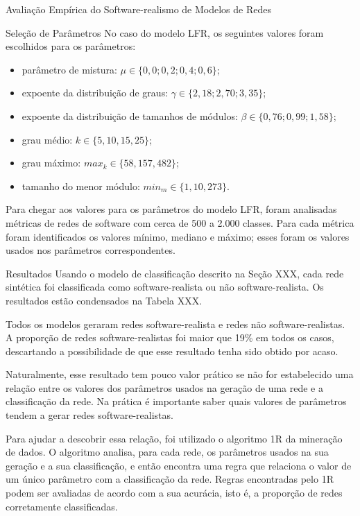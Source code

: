 \begin{section}{Avaliação Empírica do Software-realismo de Modelos de Redes}
\begin{subsection}{Seleção de Parâmetros}
No caso do modelo LFR, os seguintes valores foram escolhidos para os parâmetros:

\begin{itemize}
	\item parâmetro de mistura: $\mu \in \{0,0; 0,2; 0,4; 0,6\}$;
	\item expoente da distribuição de graus: $\gamma \in \{2,18; 2,70; 3,35\}$;
	\item expoente da distribuição de tamanhos de módulos: $\beta \in \{0,76; 0,99; 1,58\}$;
	\item grau médio: $k \in \{5, 10, 15, 25\}$;
	\item grau máximo: $max_k \in \{58, 157, 482\}$;
	\item tamanho do menor módulo: $min_m \in \{1, 10, 273\}$.
\end{itemize}

Para chegar aos valores para os parâmetros do modelo LFR, foram analisadas métricas de redes de software com cerca de 500 a 2.000 classes. Para cada métrica foram identificados os valores mínimo, mediano e máximo; esses foram os valores usados nos parâmetros correspondentes.
\end{subsection}

\begin{subsection}{Resultados}
Usando o modelo de classificação descrito na Seção XXX, cada rede sintética foi classificada como software-realista ou não software-realista. Os resultados estão condensados na Tabela XXX.

Todos os modelos geraram redes software-realista e redes não software-realistas. A proporção de redes software-realistas foi maior que 19\% em todos os casos, descartando a possibilidade de que esse resultado tenha sido obtido por acaso.

Naturalmente, esse resultado tem pouco valor prático se não for estabelecido uma relação entre os valores dos parâmetros usados na geração de uma rede e a classificação da rede. Na prática é importante saber quais valores de parâmetros tendem a gerar redes software-realistas.

Para ajudar a descobrir essa relação, foi utilizado o algoritmo 1R \cite{OneR} da mineração de dados. O algoritmo analisa, para cada rede, os parâmetros usados na sua geração e a sua classificação, e então encontra uma regra que relaciona o valor de um único parâmetro com a classificação da rede. Regras encontradas pelo 1R podem ser avaliadas de acordo com a sua acurácia, isto é, a proporção de redes corretamente classificadas.


\end{subsection}
\end{section}
